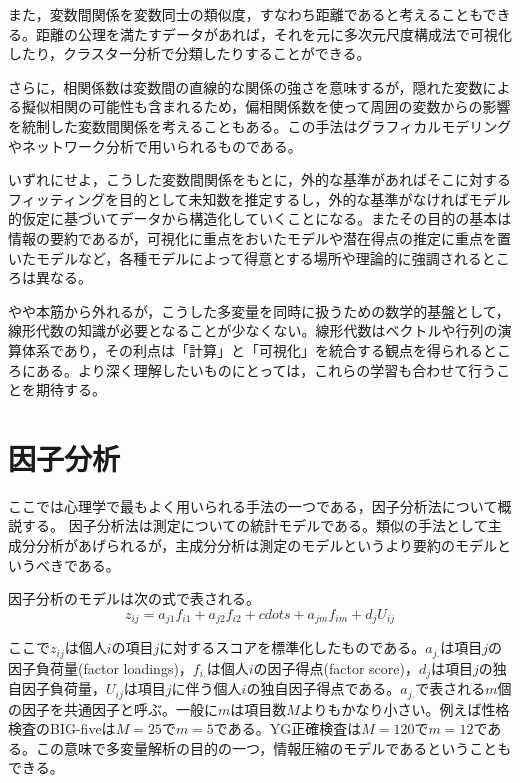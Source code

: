 \documentclass[
  a4paper,
]{ltjsbook}
\begin{document}
また，変数間関係を変数同士の類似度，すなわち距離であると考えることもできる。距離の公理を満たすデータがあれば，それを元に多次元尺度構成法\autocite{Takane198002,Okada19940115}で可視化したり，クラスター分析で分類\autocite{clusterAnalysis,Adachi200607}したりすることができる。

さらに，相関係数は変数間の直線的な関係の強さを意味するが，隠れた変数による擬似相関の可能性も含まれるため，偏相関係数を使って周囲の変数からの影響を統制した変数間関係を考えることもある。この手法はグラフィカルモデリング\autocite{Miyagawa1997}やネットワーク分析\autocite{Network2024}で用いられるものである。

いずれにせよ，こうした変数間関係をもとに，外的な基準があればそこに対するフィッティングを目的として未知数を推定するし，外的な基準がなければモデル的仮定に基づいてデータから構造化していくことになる。またその目的の基本は情報の要約であるが，可視化に重点をおいたモデルや潜在得点の推定に重点を置いたモデルなど，各種モデルによって得意とする場所や理論的に強調されるところは異なる。

やや本筋から外れるが，こうした多変量を同時に扱うための数学的基盤として，線形代数の知識が必要となることが少なくない。線形代数はベクトルや行列の演算体系であり，その利点は「計算」と「可視化」を統合する観点を得られるところにある。より深く理解したいものにとっては，これらの学習も合わせて行うことを期待する。

\section{因子分析}\label{ux56e0ux5b50ux5206ux6790}

ここでは心理学で最もよく用いられる手法の一つである，因子分析法について概説する。
因子分析法は測定についての統計モデルである。類似の手法として主成分分析があげられるが，主成分分析は測定のモデルというより要約のモデルというべきである。

因子分析のモデルは次の式で表される。
\[ z_{ij} = a_{j1}f_{i1}+a_{j2}f_{i2}+cdots+a_{jm}f_{im}+d_jU_{ij} \]

ここで\(z_{ij}\)は個人\(i\)の項目\(j\)に対するスコアを標準化したものである。\(a_{j.}\)は項目\(j\)の因子負荷量(factor
loadings)，\(f_{i.}\)は個人\(i\)の因子得点(factor
score)，\(d_j\)は項目\(j\)の独自因子負荷量，\(U_{ij}\)は項目\(j\)に伴う個人\(i\)の独自因子得点である。\(a_{j.}\)で表される\(m\)個の因子を共通因子と呼ぶ。一般に\(m\)は項目数\(M\)よりもかなり小さい。例えば性格検査のBIG-fiveは\(M=25\)で\(m=5\)である。YG正確検査は\(M=120\)で\(m=12\)である。この意味で多変量解析の目的の一つ，情報圧縮のモデルであるということもできる。
\end{document}
